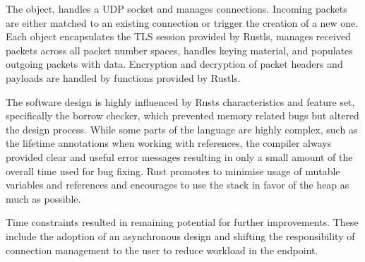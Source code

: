 The  object, handles a UDP socket and manages connections. Incoming packets are either matched
to an existing connection or trigger the creation of a new one. Each  object encapsulates the TLS
session provided by Rustls, manages received packets across all packet number spaces, handles keying material, and
populates outgoing packets with data. Encryption and decryption of packet headers and payloads are handled by functions
provided by Rustls.

The software design is highly influenced by Rusts characteristics and feature set, specifically the borrow checker, which
prevented memory related bugs but altered the design process. While some parts of the language
are highly complex, such as the lifetime annotations when working with references, the compiler always provided clear and
useful error messages resulting in only a small amount of the overall time used for bug fixing. Rust promotes to
minimise usage of mutable variables and references and encourages to use the stack in favor of the heap as much as possible.

Time constraints resulted in remaining potential for further improvements. These include the adoption of
an asynchronous design and shifting the responsibility of connection management to the user to reduce workload
in the endpoint.